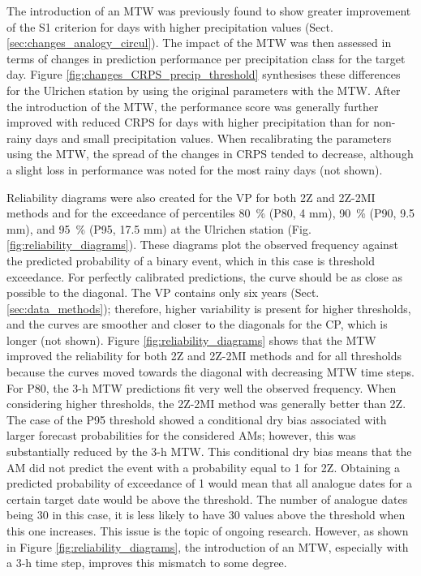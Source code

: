 \documentclass[hess, manuscript]{copernicus}
\begin{document}
	The introduction of an MTW was previously found to show greater improvement of the S1 criterion for days with higher precipitation values (Sect. \ref{sec:changes_analogy_circul}). The impact of the MTW was then assessed in terms of changes in prediction performance per precipitation class for the target day. Figure \ref{fig:changes_CRPS_precip_threshold} synthesises these differences for the Ulrichen station by using the original parameters with the MTW. After the introduction of the MTW, the performance score was generally further improved with reduced CRPS for days with higher precipitation than for non-rainy days and small precipitation values. When recalibrating the parameters using the MTW, the spread of the changes in CRPS tended to decrease, although a slight loss in performance was noted for the most rainy days (not shown).
	
	Reliability diagrams were also created for the VP for both 2Z and 2Z-2MI methods and for the exceedance of percentiles 80~\% (P80, 4 mm), 90~\% (P90, 9.5 mm), and 95~\% (P95, 17.5 mm) at the Ulrichen station (Fig. \ref{fig:reliability_diagrams}). These diagrams plot the observed frequency against the predicted probability of a binary event, which in this case is threshold exceedance. For perfectly calibrated predictions, the curve should be as close as possible to the diagonal. The VP contains only six years (Sect. \ref{sec:data_methods}); therefore, higher variability is present for higher thresholds, and the curves are smoother and closer to the diagonals for the CP, which is longer (not shown). Figure \ref{fig:reliability_diagrams} shows that the MTW improved the reliability for both 2Z and 2Z-2MI methods and for all thresholds because the curves moved towards the diagonal with decreasing MTW time steps. For P80, the 3-h MTW predictions fit very well the observed frequency. When considering higher thresholds, the 2Z-2MI method was generally better than 2Z. The case of the P95 threshold showed a conditional dry bias associated with larger forecast probabilities for the considered AMs; however, this was substantially reduced by the 3-h MTW. This conditional dry bias means that the AM did not predict the event with a probability equal to 1 for 2Z. Obtaining a predicted probability of exceedance of 1 would mean that all analogue dates for a certain target date would be above the threshold. The number of analogue dates being 30 in this case, it is less likely to have 30 values above the threshold when this one increases. This issue is the topic of ongoing research. However, as shown in Figure \ref{fig:reliability_diagrams}, the introduction of an MTW, especially with a 3-h time step, improves this mismatch to some degree.
	
\end{document}
